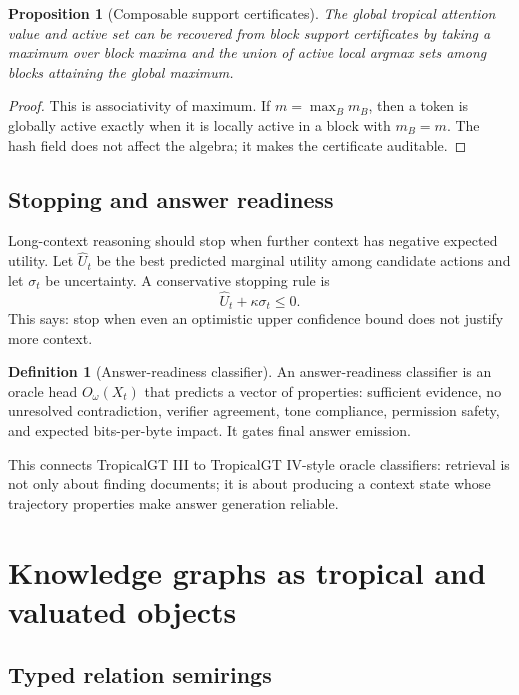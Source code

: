 \documentclass[11pt]{article}
\newtheorem{proposition}[theorem]{Proposition}
\theoremstyle{definition}
\newtheorem{definition}[theorem]{Definition}
\theoremstyle{remark}
\begin{document}
\begin{proposition}[Composable support certificates]
The global tropical attention value and active set can be recovered from block support certificates by taking a maximum over block maxima and the union of active local argmax sets among blocks attaining the global maximum.
\end{proposition}
\begin{proof}
This is associativity of maximum. If \(m=\max_B m_B\), then a token is globally active exactly when it is locally active in a block with \(m_B=m\). The hash field does not affect the algebra; it makes the certificate auditable.
\end{proof}

\subsection{Stopping and answer readiness}

Long-context reasoning should stop when further context has negative expected utility. Let \(\widehat U_t\) be the best predicted marginal utility among candidate actions and let \(\sigma_t\) be uncertainty. A conservative stopping rule is
\[
    \widehat U_t+\kappa\sigma_t\le 0.
\]
This says: stop when even an optimistic upper confidence bound does not justify more context.

\begin{definition}[Answer-readiness classifier]
An answer-readiness classifier is an oracle head \(O_\omega(X_t)\) that predicts a vector of properties: sufficient evidence, no unresolved contradiction, verifier agreement, tone compliance, permission safety, and expected bits-per-byte impact. It gates final answer emission.
\end{definition}

This connects TropicalGT III to TropicalGT IV-style oracle classifiers: retrieval is not only about finding documents; it is about producing a context state whose trajectory properties make answer generation reliable.

\section{Knowledge graphs as tropical and valuated objects}

\subsection{Typed relation semirings}
\end{document}
